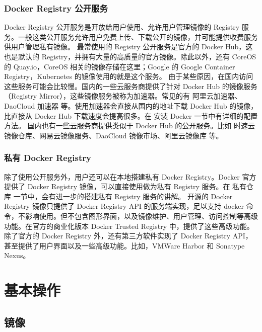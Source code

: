 \documentclass[letterpaper,10pt,english]{sphinxmanual}
\begin{document}
\subsection{Docker Registry 公开服务}
\label{\detokenize{docker/basic_concept:id6}}
Docker Registry 公开服务是开放给用户使用、允许用户管理镜像的 Registry 服务。一般这类公开服务允许用户免费上传、下载公开的镜像，并可能提供收费服务供用户管理私有镜像。
最常使用的 Registry 公开服务是官方的 Docker Hub，这也是默认的 Registry，并拥有大量的高质量的官方镜像。除此以外，还有 CoreOS 的 Quay.io，CoreOS 相关的镜像存储在这里；Google 的 Google Container Registry，Kubernetes 的镜像使用的就是这个服务。
由于某些原因，在国内访问这些服务可能会比较慢。国内的一些云服务商提供了针对 Docker Hub 的镜像服务（Registry Mirror），这些镜像服务被称为加速器。常见的有 阿里云加速器、DaoCloud 加速器 等。使用加速器会直接从国内的地址下载 Docker Hub 的镜像，比直接从 Docker Hub 下载速度会提高很多。在 安装 Docker 一节中有详细的配置方法。
国内也有一些云服务商提供类似于 Docker Hub 的公开服务。比如 时速云镜像仓库、网易云镜像服务、DaoCloud 镜像市场、阿里云镜像库 等。


\subsection{私有 Docker Registry}
\label{\detokenize{docker/basic_concept:id7}}
除了使用公开服务外，用户还可以在本地搭建私有 Docker Registry。Docker 官方提供了 Docker Registry 镜像，可以直接使用做为私有 Registry 服务。在 私有仓库 一节中，会有进一步的搭建私有 Registry 服务的讲解。
开源的 Docker Registry 镜像只提供了 Docker Registry API 的服务端实现，足以支持 docker 命令，不影响使用。但不包含图形界面，以及镜像维护、用户管理、访问控制等高级功能。在官方的商业化版本 Docker Trusted Registry 中，提供了这些高级功能。
除了官方的 Docker Registry 外，还有第三方软件实现了 Docker Registry API，甚至提供了用户界面以及一些高级功能。比如，VMWare Harbor 和 Sonatype Nexus。


\chapter{基本操作}
\label{\detokenize{docker/basic_cmd:id1}}\label{\detokenize{docker/basic_cmd::doc}}

\section{镜像}
\label{\detokenize{docker/basic_cmd:id2}}
\end{document}
